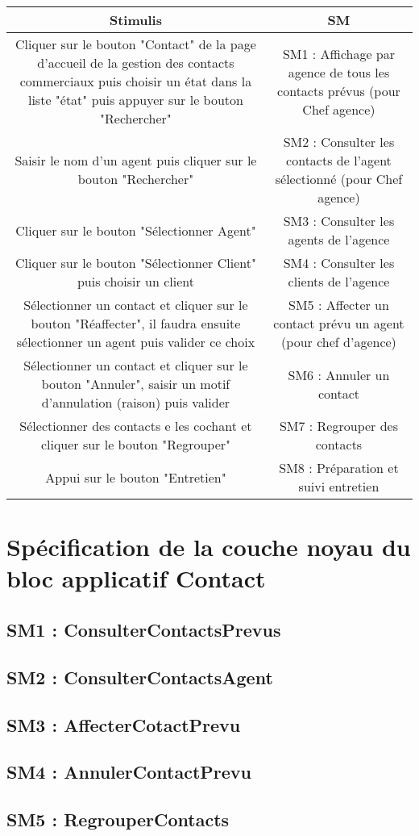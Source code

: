 \begin{tabular}{|c|c|}
\hline
Stimulis 
& SM \\
\hline
Cliquer sur le bouton "Contact" de la page d'accueil de la gestion des contacts commerciaux puis choisir un état dans la liste "état" puis appuyer sur le bouton "Rechercher"
& SM1 : Affichage par agence de tous les contacts prévus (pour Chef agence)\\
\hline
Saisir le nom d'un agent puis cliquer sur le bouton "Rechercher"
& SM2 : Consulter les contacts de l'agent sélectionné (pour Chef agence)\\
\hline
Cliquer sur le bouton "Sélectionner Agent"
& SM3 : Consulter les agents de l'agence\\
\hline
Cliquer sur le bouton "Sélectionner Client" puis choisir un client
& SM4 : Consulter les clients de l'agence\\
\hline
Sélectionner un contact et cliquer sur le bouton "Réaffecter", il faudra ensuite sélectionner un agent puis valider ce choix
& SM5 : Affecter un contact prévu un agent (pour chef d'agence)\\
\hline
Sélectionner un contact et cliquer sur le bouton "Annuler", saisir un motif d'annulation (raison) puis valider
& SM6 : Annuler un contact\\
\hline
Sélectionner des contacts e les cochant et cliquer sur le bouton "Regrouper"
& SM7 : Regrouper des contacts\\
\hline
Appui sur le bouton "Entretien"
& SM8 : Préparation et suivi entretien\\
\hline
\end{tabular}


\section{Spécification de la couche noyau du bloc applicatif Contact}

       \subsection{SM1 : ConsulterContactsPrevus}

       \subsection{SM2 : ConsulterContactsAgent}

       \subsection{SM3 : AffecterCotactPrevu}

       \subsection{SM4 : AnnulerContactPrevu}

       \subsection{SM5 : RegrouperContacts}